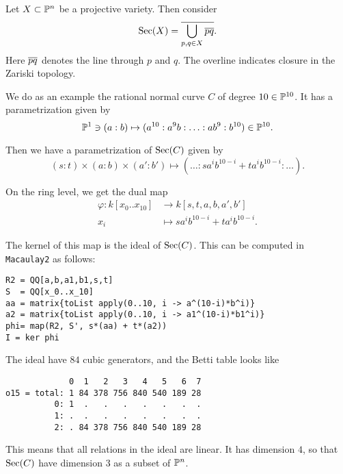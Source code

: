 \documentclass[11pt, english]{article}
\begin{document}
Let $X \subset \mathbb{P}^n$ be a projective variety. Then consider
$$
\operatorname{Sec}(X) = \overline{\bigcup_{p,q \in X} \overline{pq}}.
$$
Here $\overline{pq}$ denotes the line through $p$ and $q$. The overline indicates closure in the Zariski topology.

We do as an example the rational normal curve $C$ of degree $10 \in \mathbb{P}^{10}$. It has a parametrization given by
\[
\mathbb{P}^1 \ni (a:b) \mapsto (a^{10}:a^9b: \ldots: ab^9 : b^{10}) \in \mathbb{P}^{10}.
\]

Then we have a parametrization of $\operatorname{Sec}(C)$ given by
\[
(s:t) \times (a:b) \times (a':b') \mapsto (\ldots: sa^ib^{10-i}+ta^ib^{10-i}: \ldots).
\]

On the ring level, we get the dual map
\begin{align*}
\varphi: k[x_0..x_{10}] &\to k[s,t,a,b,a',b'] \\
x_i &\mapsto sa^{i}b^{10-i} + ta^{i}b^{10-i}.
\end{align*}

The kernel of this map is the ideal of $\operatorname{Sec}(C)$. This can be computed in \verb|Macaulay2| as follows:

\begin{verbatim}
R2 = QQ[a,b,a1,b1,s,t]
S  = QQ[x_0..x_10]
aa = matrix{toList apply(0..10, i -> a^(10-i)*b^i)}
a2 = matrix{toList apply(0..10, i -> a1^(10-i)*b1^i)}
phi= map(R2, S', s*(aa) + t*(a2))
I = ker phi
\end{verbatim}

The ideal have $84$ cubic generators, and the Betti table looks like
\begin{verbatim}
             0  1   2   3   4   5   6  7
o15 = total: 1 84 378 756 840 540 189 28
          0: 1  .   .   .   .   .   .  .
          1: .  .   .   .   .   .   .  .
          2: . 84 378 756 840 540 189 28
\end{verbatim}
This means that all relations in the ideal are linear. It has dimension $4$, so that $\operatorname{Sec}(C)$ have dimension $3$ as a subset of $\mathbb{P}^n$.
\end{document}
